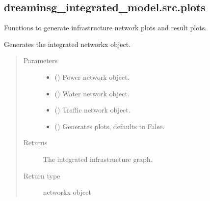 \documentclass[letterpaper,10pt,english]{sphinxmanual}
\begin{document}
\subsection{dreaminsg\_integrated\_model.src.plots}
\label{\detokenize{apidoc:module-dreaminsg_integrated_model.src.plots}}\label{\detokenize{apidoc:dreaminsg-integrated-model-src-plots}}
\sphinxAtStartPar
Functions to generate infrastructure network plots and result plots.

\begin{fulllineitems}
\label{\detokenize{apidoc:dreaminsg_integrated_model.src.plots.plot_integrated_network}}
\sphinxAtStartPar
Generates the integrated networkx object.
\begin{quote}\begin{description}
\item[{Parameters}] \leavevmode\begin{itemize}
\item {} 
\sphinxAtStartPar
{} () \textendash{} Power network object.

\item {} 
\sphinxAtStartPar
{} () \textendash{} Water network object.

\item {} 
\sphinxAtStartPar
{} () \textendash{} Traffic network object.

\item {} 
\sphinxAtStartPar
{} (\sphinxstyleliteralemphasis{\sphinxupquote{, }}) \textendash{} Generates plots, defaults to False.

\end{itemize}

\item[{Returns}] \leavevmode
\sphinxAtStartPar
The integrated infrastructure graph.

\item[{Return type}] \leavevmode
\sphinxAtStartPar
networkx object

\end{description}\end{quote}

\end{fulllineitems}
\end{document}
